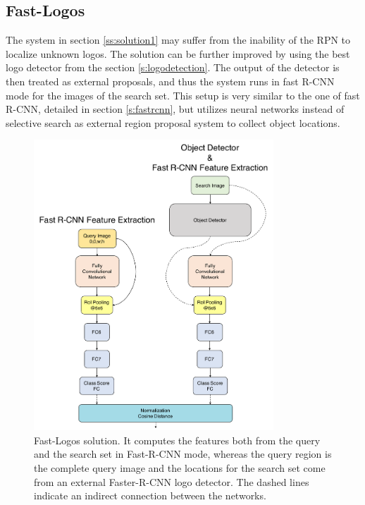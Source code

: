\subsection{Fast-Logos}\label{ss:solution3}
The system in section \ref{ss:solution1} may suffer from the inability of the RPN to localize unknown logos. The solution can be further improved by using the best logo detector from the section \ref{s:logodetection}.  The output of the detector is then treated as external proposals, and thus the system runs in fast R-CNN mode for the images of the search set. This setup is very similar to the one of fast R-CNN, detailed in section \ref{s:fastrcnn}, but utilizes neural networks instead of selective search as external region proposal system to collect object locations.
\begin{figure}
  \centering
  \includegraphics[width=90mm]{images/mt/sol3_arch.pdf}
  \caption{Fast-Logos solution. It computes the features both from the query and the search set in Fast-R-CNN mode, whereas the query region is the complete query image and the locations for the search set come from an external Faster-R-CNN logo detector. The dashed lines indicate an indirect connection between the networks.}
  \label{f:sol3arch}
\end{figure}
